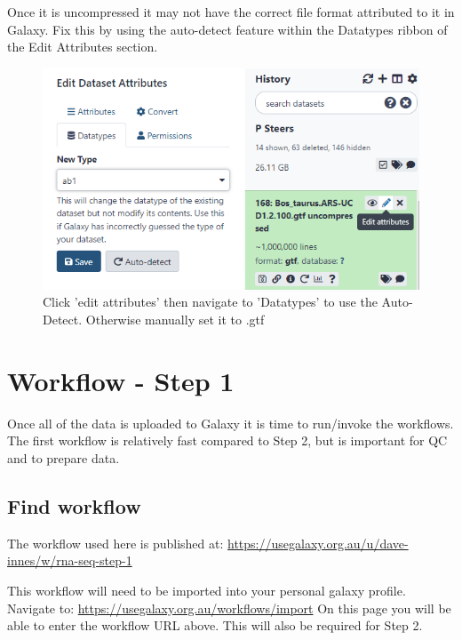 \documentclass[
]{book}
\begin{document}
Once it is uncompressed it may not have the correct file format attributed to it in Galaxy. Fix this by using the auto-detect feature within the Datatypes ribbon of the Edit Attributes section.

\begin{figure}

{\centering \includegraphics[width=1\linewidth]{images/image_edit_attributes} 

}

\caption{Click 'edit attributes' then navigate to 'Datatypes' to use the Auto-Detect. Otherwise manually set it to .gtf}\label{fig:edit-attributes}
\end{figure}

\hypertarget{step1}{%
\chapter{Workflow - Step 1}\label{step1}}

Once all of the data is uploaded to Galaxy it is time to run/invoke the workflows.
The first workflow is relatively fast compared to Step 2, but is important for QC and to prepare data.

\hypertarget{workflow-instructions}{%
\section{Find workflow}\label{workflow-instructions}}

The workflow used here is published at: \url{https://usegalaxy.org.au/u/dave-innes/w/rna-seq-step-1}

This workflow will need to be imported into your personal galaxy profile. Navigate to: \url{https://usegalaxy.org.au/workflows/import}
On this page you will be able to enter the workflow URL above. This will also be required for Step 2.
\end{document}
